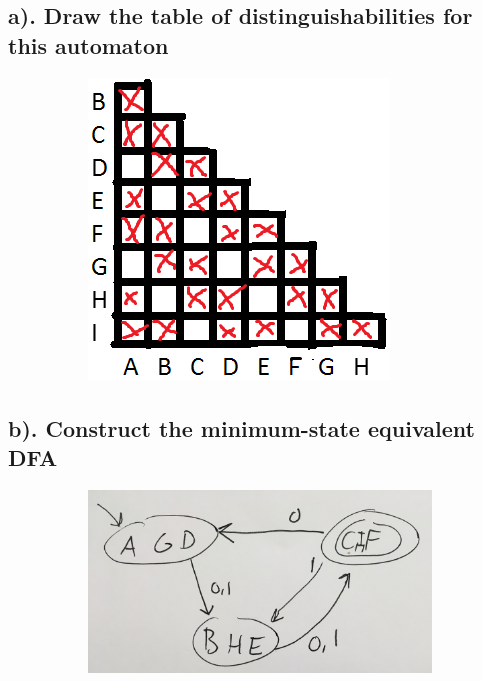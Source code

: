 \documentclass[20pt]{article} %
\begin{document}
\subsection{a). Draw the table of distinguishabilities for this automaton}
\begin{figure}[!htbp]
  	\centering
   	\begin{subfigure}[p]{0.4\linewidth}
    	\includegraphics[width=\linewidth]{./figures/h5-1.png}
   	\end{subfigure}
\end{figure} 
\subsection{b). Construct the minimum-state equivalent DFA}
\begin{figure}[!htbp]
  	\centering
   	\begin{subfigure}[p]{0.5\linewidth}
    	\includegraphics[width=\linewidth]{./figures/h5-2.jpg}
   	\end{subfigure}
\end{figure} 
\end{document}
